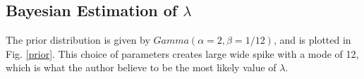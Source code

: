 \documentclass{article}
\begin{document}
	\subsection{Bayesian Estimation of $\lambda$}
	The prior distribution is given by $Gamma(\alpha = 2, \beta = 1/12)$, and is plotted in Fig. \ref{prior}. This choice of parameters creates large wide spike with a mode of 12, which is what the author believe to be the most likely value of $\lambda$.
	
	

	
	
	
\end{document}
